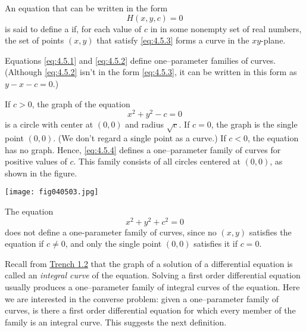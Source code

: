 \documentclass{ximera}
\begin{document}
 
 
 
 
\begin{definition}\label{thmtype:4.5.1}
An equation that can be written in the form
 \begin{equation} \label{eq:4.5.3}
H(x,y,c)=0
\end{equation}
is said to define a  if, for
each value of $c$ in in some nonempty set of real numbers, the set of
points $(x,y)$ that satisfy  \eqref{eq:4.5.3} forms a curve in the
$xy$-plane.
\end{definition}
 
Equations \eqref{eq:4.5.1} and \eqref{eq:4.5.2} define one--parameter families
of curves. (Although \eqref{eq:4.5.2} isn't  in the form \eqref{eq:4.5.3}, it
can be written in this form as $y-x-c=0$.)
 
 
 
\begin{example}\label{example:4.5.3}
If $c>0$,  the graph of the equation
\begin{equation} \label{eq:4.5.4}
x^2+y^2-c=0
\end{equation}
is a circle with center at $(0,0)$ and radius $\sqrt{c}$. If $c=0$, the
graph is the single point $(0,0)$. (We don't regard a single point as
a curve.) If $c<0$, the equation has no graph. Hence, \eqref{eq:4.5.4}
defines a one--parameter family of curves for positive values of $c$.
This family consists of all circles centered at $(0,0)$, as shown in the figure.
 
\begin{image}
  \texttt{[image: fig040503.jpg]}
\end{image}
 
\end{example}
 
\begin{example}\label{example:4.5.4}
 The equation
$$
x^2+y^2+c^2=0
$$
does not define a one-parameter family of curves, since no $(x,y)$
satisfies the equation if $c\neq 0$, and only the single point $(0,0)$
satisfies it if $c=0$.
\end{example}
 
Recall from \href{https://ximera.osu.edu/ode/main/basicConcepts/basicConcepts}{Trench 1.2} that the graph of a solution of a
differential equation is called an \textit{integral curve} of the
equation. Solving a first order differential equation usually produces
a one--parameter family of integral curves of the equation. Here we
are interested in the converse problem:
given a one--parameter family of curves, is there a first order
differential equation for which every  member of the family is an integral
curve.
This suggests the next definition.
 
\end{document}
